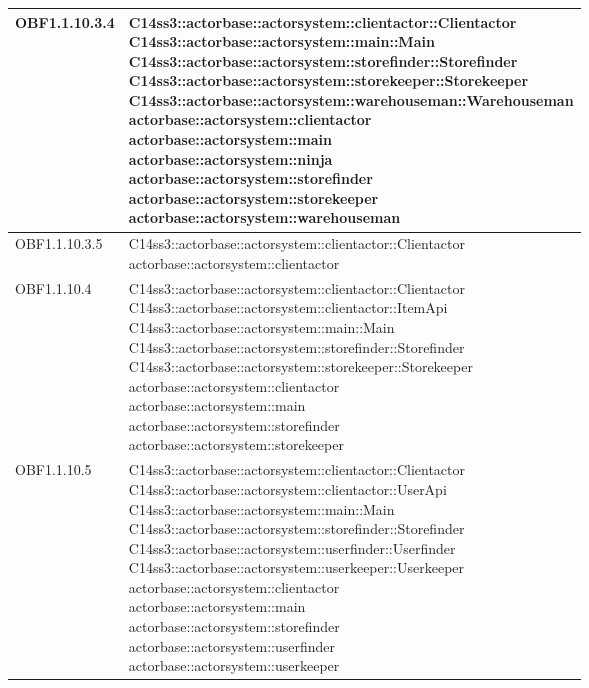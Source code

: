 \documentclass{scalatekids-article}
\begin{document}
\begin{longtable}[H]{|p{4.5cm}|p{13cm}|}
\hline
OBF1.1.10.3.4 & \multiLineCell[t]{C14ss3::actorbase::actorsystem::clientactor::Clientactor\\C14ss3::actorbase::actorsystem::main::Main\\C14ss3::actorbase::actorsystem::storefinder::Storefinder\\C14ss3::actorbase::actorsystem::storekeeper::Storekeeper\\C14ss3::actorbase::actorsystem::warehouseman::Warehouseman\\actorbase::actorsystem::clientactor\\actorbase::actorsystem::main\\actorbase::actorsystem::ninja\\actorbase::actorsystem::storefinder\\actorbase::actorsystem::storekeeper\\actorbase::actorsystem::warehouseman\\}\\
\hline
OBF1.1.10.3.5 & \multiLineCell[t]{C14ss3::actorbase::actorsystem::clientactor::Clientactor\\actorbase::actorsystem::clientactor\\}\\
\hline
OBF1.1.10.4 & \multiLineCell[t]{C14ss3::actorbase::actorsystem::clientactor::Clientactor\\C14ss3::actorbase::actorsystem::clientactor::ItemApi\\C14ss3::actorbase::actorsystem::main::Main\\C14ss3::actorbase::actorsystem::storefinder::Storefinder\\C14ss3::actorbase::actorsystem::storekeeper::Storekeeper\\actorbase::actorsystem::clientactor\\actorbase::actorsystem::main\\actorbase::actorsystem::storefinder\\actorbase::actorsystem::storekeeper\\}\\
\hline
OBF1.1.10.5 & \multiLineCell[t]{C14ss3::actorbase::actorsystem::clientactor::Clientactor\\C14ss3::actorbase::actorsystem::clientactor::UserApi\\C14ss3::actorbase::actorsystem::main::Main\\C14ss3::actorbase::actorsystem::storefinder::Storefinder\\C14ss3::actorbase::actorsystem::userfinder::Userfinder\\C14ss3::actorbase::actorsystem::userkeeper::Userkeeper\\actorbase::actorsystem::clientactor\\actorbase::actorsystem::main\\actorbase::actorsystem::storefinder\\actorbase::actorsystem::userfinder\\actorbase::actorsystem::userkeeper\\}\\

\end{longtable}
\end{document}
